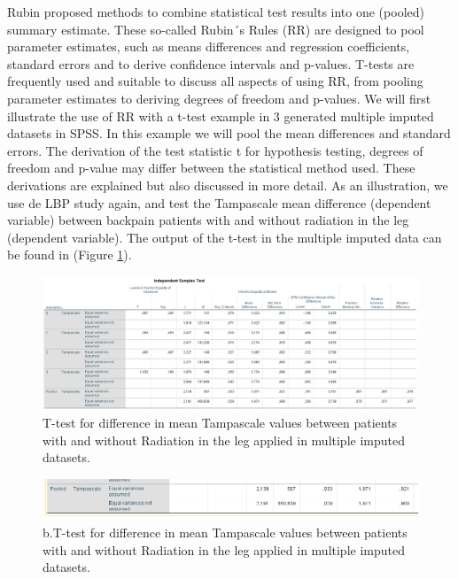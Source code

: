 \documentclass[]{book}
\theoremstyle{definition}
\theoremstyle{definition}
\theoremstyle{definition}
\theoremstyle{remark}
\begin{document}
Rubin proposed methods to combine statistical test results into one
(pooled) summary estimate. These so-called Rubin´s Rules (RR) are
designed to pool parameter estimates, such as means differences and
regression coefficients, standard errors and to derive confidence
intervals and p-values. T-tests are frequently used and suitable to
discuss all aspects of using RR, from pooling parameter estimates to
deriving degrees of freedom and p-values. We will first illustrate the
use of RR with a t-test example in 3 generated multiple imputed datasets
in SPSS. In this example we will pool the mean differences and standard
errors. The derivation of the test statistic t for hypothesis testing,
degrees of freedom and p-value may differ between the statistical method
used. These derivations are explained but also discussed in more detail.
As an illustration, we use de LBP study again, and test the Tampascale
mean difference (dependent variable) between backpain patients with and
without radiation in the leg (dependent variable). The output of the
t-test in the multiple imputed data can be found in (Figure
\ref{fig:tab5-1a}).

\begin{figure}

{\centering \includegraphics[width=0.9\linewidth]{images/table5.1} 

}

\caption{T-test for difference in mean Tampascale values between patients with and without Radiation in the leg applied in multiple imputed datasets.}\label{fig:tab5-1a}
\end{figure}

\begin{figure}

{\centering \includegraphics[width=0.9\linewidth]{images/table5.1b} 

}

\caption{b.T-test for difference in mean Tampascale values between patients with and without Radiation in the leg applied in multiple imputed datasets.}\label{fig:tab5-1b}
\end{figure}
\end{document}
